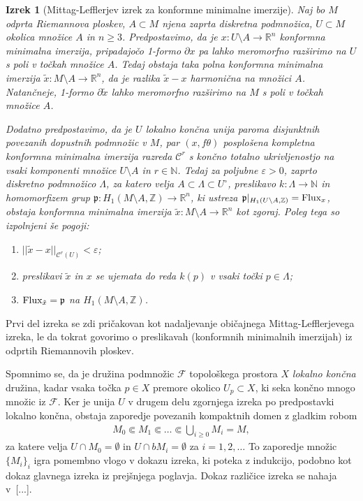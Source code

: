 \documentclass[12pt,a4paper,twoside]{article}
\theoremstyle{definition} %
\theoremstyle{plain} %
\newtheorem{izrek}[definicija]{Izrek}
\numberwithin{equation}{section}  %
\newcommand{\R}{\mathbb R}
\newcommand{\N}{\mathbb N}
\newcommand{\Z}{\mathbb Z}
\begin{document}
\begin{izrek} [Mittag-Lefflerjev izrek za konformne minimalne imerzije] \label{izr:ML-CMI}
Naj bo $M$ odprta Riemannova ploskev, $A \subset M$ njena zaprta diskretna podmnožica, $U \subset M$ okolica množice $A$ in $n \geq 3$.
Predpostavimo, da je $x \colon U \setminus A \to \R^{n}$ konformna minimalna imerzija, pripadajočo 1-formo $\partial x$ pa lahko meromorfno razširimo na $U$ s poli v točkah množice $A$.
Tedaj obstaja taka polna konformna minimalna imerzija $\tilde{x} \colon M \setminus A \to \R^{n}$, da je razlika $\tilde{x}-x$ harmonična na množici $A$.
Natančneje, 1-formo $\partial \tilde{x}$ lahko meromorfno razširimo na $M$ s poli v točkah množice $A$.

Dodatno predpostavimo, da je $U$ lokalno končna unija paroma disjunktnih povezanih dopustnih podmnožic v $M$, par $(x, f\theta)$ posplošena kompletna konformna minimalna imerzija razreda $\mathcal{C}^{r}$ s končno totalno ukrivljenostjo na vsaki komponenti množice $U \setminus A$ in $r \in \N$.
Tedaj za poljubne $\varepsilon > 0$, zaprto diskretno podmnožico $\Lambda$, za katero velja $A \subset \Lambda \subset U^{\circ}$, preslikavo $k \colon \Lambda \to \N$ in homomorfizem grup $\mathfrak{p} \colon H_{1}(M \setminus A, \Z) \to \R^{n}$, ki ustreza $\mathfrak{p}|_{H_{1}(U \setminus A, \Z)} = \textup{Flux}_{x}$, obstaja konformna minimalna imerzija $\tilde{x} \colon M \setminus A \to \R^{n}$ kot zgoraj. Poleg tega so izpolnjeni še pogoji:
\begin{enumerate}
\item $||\tilde{x}-x||_{\mathcal{C}^{r}(U)} < \varepsilon$;
\item preslikavi $\tilde{x}$ in $x$ se ujemata do reda $k(p)$ v vsaki točki $p \in \Lambda$;
\item $\textup{Flux}_{\tilde{x}} = \mathfrak{p}$ na $H_{1}(M \setminus A, \Z)$.
\end{enumerate}
\end{izrek}

Prvi del izreka se zdi pričakovan kot nadaljevanje običajnega Mittag-Lefflerjevega izreka, le da tokrat govorimo o preslikavah (konformnih minimalnih imerzijah) iz odprtih Riemannovih ploskev.

Spomnimo se, da je družina podmnožic $\mathcal{F}$ topološkega prostora $X$ \emph{lokalno končna} družina, kadar vsaka točka $p \in X$ premore okolico $U_{p} \subset X$, ki seka končno mnogo množic iz $\mathcal{F}$.
Ker je unija $U$ v drugem delu zgornjega izreka po predpostavki lokalno končna, obstaja zaporedje povezanih kompaktnih domen z gladkim robom
\begin{gather*}
M_{0} \Subset M_{1} \Subset \dots \Subset \bigcup_{i \geq 0} M_{i}=M,
\end{gather*}
za katere velja $U \cap M_{0} = \emptyset$ in $U \cap bM_{i} = \emptyset$ za $i = 1,2,\dots$ To zaporedje množic $\{ M_{i} \}_{i}$ igra pomembno vlogo v dokazu izreka, ki poteka z indukcijo, podobno kot dokaz glavnega izreka iz prejšnjega poglavja.
Dokaz različice izreka se nahaja v~[...]. %
\end{document}
